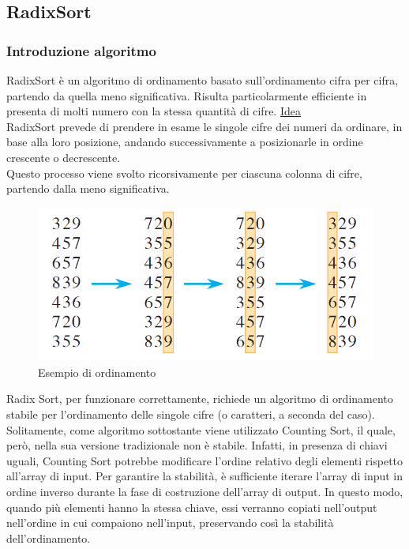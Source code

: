 \documentclass[a4paper, 11pt]{article}
\begin{document}
\subsection{RadixSort}
\subsubsection*{Introduzione algoritmo}
RadixSort è un algoritmo di ordinamento basato sull'ordinamento cifra per cifra, partendo da quella meno significativa. Risulta particolarmente efficiente in presenta di molti numero con la stessa quantità di cifre.\bigbreak
\noindent \underline{Idea}\\
RadixSort prevede di prendere in esame le singole cifre dei numeri da ordinare, in base alla loro posizione, andando successivamente a posizionarle in ordine crescente o decrescente.\\
Questo processo viene svolto ricorsivamente per ciascuna colonna di cifre, partendo dalla meno significativa.

\begin{figure}[H]
    \centering
    \includegraphics[scale=0.5]{./Immagini/RadixSort.png}
    \caption*{Esempio di ordinamento}
\end{figure}

Radix Sort, per funzionare correttamente, richiede un algoritmo di ordinamento stabile per l'ordinamento delle singole cifre (o caratteri, a seconda del caso).\bigbreak
\noindent Solitamente, come algoritmo sottostante viene utilizzato Counting Sort, il quale, però, nella sua versione tradizionale non è stabile. Infatti, in presenza di chiavi uguali, Counting Sort potrebbe modificare l'ordine relativo degli elementi rispetto all'array di input.\bigbreak
\noindent Per garantire la stabilità, è sufficiente iterare l'array di input in ordine inverso durante la fase di costruzione dell'array di output. In questo modo, quando più elementi hanno la stessa chiave, essi verranno copiati nell'output nell'ordine in cui compaiono nell'input, preservando così la stabilità dell'ordinamento.
\end{document}
